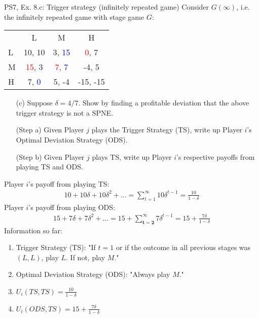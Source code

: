 \begin{frame}{PS7, Ex. 8.c: Trigger strategy (infinitely repeated game)}
    Consider $G(\infty)$, i.e. the infinitely repeated game with stage game $G$: \vspace{-6pt}
    \begin{table}
      \begin{tabular}{l|c|c|c|}
        \multicolumn{1}{c}{} & \multicolumn{1}{c}{L} & \multicolumn{1}{c}{M} & \multicolumn{1}{c}{H} \\\cline{2-4}
        L & 10, 10 & 3, \textcolor{blue}{15} & \textcolor{red}{0}, 7 \\\cline{2-4}
        M & \textcolor{red}{15}, 3 & \textcolor{red}{7}, \textcolor{blue}{7} & -4, 5 \\\cline{2-4}
        H & 7, \textcolor{blue}{0} & 5, -4 & -15, -15 \\\cline{2-4}
      \end{tabular}
    \end{table}
    \begin{itemize}
      \vspace{-4pt} \item[(c)] Suppose $\delta = 4/7$. Show by finding a profitable deviation that the above trigger strategy is not a SPNE. \vspace{-6pt}
    \end{itemize}
    \begin{multicols}{2}
      \begin{itemize}
        \item[(Step a)] Given Player $j$ plays the Trigger Strategy (TS), write up Player $i$'s Optimal Deviation Strategy (ODS).
        \item[(Step b)] Given Player $j$ plays TS, write up Player $i$'s respective payoffs from playing TS and ODS.
      \end{itemize}
      Player $i$'s payoff from playing TS:
      \vspace{-4pt}
      \begin{align*}
        10+10\delta+10\delta^2+...=\sum_{t=1}^\infty10\delta^{t-1}=\frac{10}{1-\delta}
      \end{align*}
      Player $i$'s payoff from playing ODS:
      \vspace{-4pt}
      \begin{align*}
        15+7\delta+7\delta^2+...=15+\sum_{\bm{t=2}}^\infty7\delta^{t-1}=15+\frac{7\delta}{1-\delta}
      \end{align*}
      \vfill\null\columnbreak
      Information so far:
      \begin{enumerate}
        \item Trigger Strategy (TS): "If $t=1$ or if the outcome in all previous stages was $(L,L)$, play $L$. If not, play $M$."
        \item Optimal Deviation Strategy (ODS): "Always play $M$."
        \item $U_i(TS,TS)=\frac{10}{1-\delta}$
        \item $U_i(ODS,TS)=15+\frac{7\delta}{1-\delta}$
      \end{enumerate}
      \vfill\null
    \end{multicols}
\end{frame}
